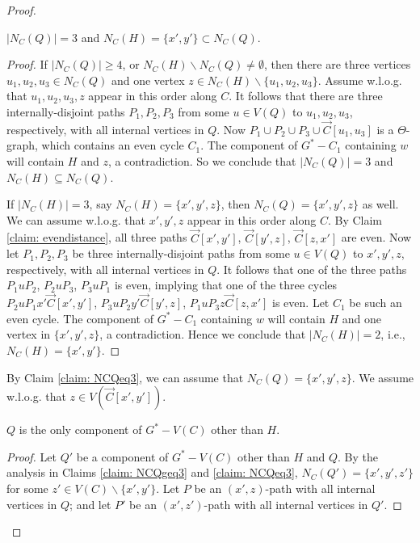 \documentclass[10pt,a4paper]{amsart}
\begin{document}
\begin{proof}
    \begin{subclaim}\label{claim: NCQeq3}
        $|N_C(Q)|=3$ and $N_C(H)=\{x',y'\}\subset N_C(Q)$.
    \end{subclaim}

    \begin{proof}
        If $|N_C(Q)|\geqslant 4$, or $N_C(H)\backslash N_C(Q)\neq\emptyset$, then there are three vertices $u_1,u_2,u_3\in N_C(Q)$ and one vertex $z\in N_C(H)\backslash\{u_1,u_2,u_3\}$. Assume w.l.o.g. that $u_1,u_2,u_3,z$ appear in this order along $C$. It follows that there are three internally-disjoint paths $P_1,P_2,P_3$ from some $u\in V(Q)$ to $u_1,u_2,u_3$, respectively, with all internal vertices in $Q$. Now $P_1\cup P_2\cup P_3\cup\overrightarrow{C}[u_1,u_3]$ is a $\varTheta$-graph, which contains an even cycle $C_1$. The component of $G^*-C_1$ containing $w$ will contain $H$ and $z$, a contradiction. So we conclude that $|N_C(Q)|=3$ and $N_C(H)\subseteq N_C(Q)$.

        If $|N_C(H)|=3$, say $N_C(H)=\{x',y',z\}$, then $N_C(Q)=\{x',y',z\}$ as well. We can assume w.l.o.g. that $x',y',z$ appear in this order along $C$. By Claim \ref{claim: evendistance}, all three paths $\overrightarrow{C}[x',y']$, $\overrightarrow{C}[y',z]$, $\overrightarrow{C}[z,x']$ are even. Now let $P_1,P_2,P_3$ be three internally-disjoint paths from some $u\in V(Q)$ to $x',y',z$, respectively, with all internal vertices in $Q$. It follows that one of the three paths $P_1uP_2$, $P_2uP_3$, $P_3uP_1$ is even, implying that one of the three cycles $P_2uP_1x'\overrightarrow{C}[x',y']$, $P_3uP_2y'\overrightarrow{C}[y',z]$, $P_1uP_3z\overrightarrow{C}[z,x']$ is even. Let $C_1$ be such an even cycle. The component of $G^*-C_1$ containing $w$ will contain $H$ and one vertex in $\{x',y',z\}$, a contradiction. Hence we conclude that $|N_C(H)|=2$, i.e., $N_C(H)=\{x',y'\}$.
    \end{proof}

    By Claim \ref{claim: NCQeq3}, we can assume that $N_C(Q)=\{x',y',z\}$. We assume w.l.o.g. that $z\in V(\overrightarrow{C}[x',y'])$.

    \begin{subclaim}\label{claim: onecomponentQ}
        $Q$ is the only component of $G^*-V(C)$ other than $H$.
    \end{subclaim}

    \begin{proof}
        Let $Q'$ be a component of $G^*-V(C)$ other than $H$ and $Q$. By the analysis in Claims \ref{claim: NCQgeq3} and \ref{claim: NCQeq3}, $N_C(Q')=\{x',y',z'\}$ for some $z'\in V(C)\backslash\{x',y'\}$. Let $P$ be an $(x',z)$-path with all internal vertices in $Q$; and let $P'$ be an $(x',z')$-path with all internal vertices in $Q'$.


\end{proof}
\end{proof}
\end{document}
